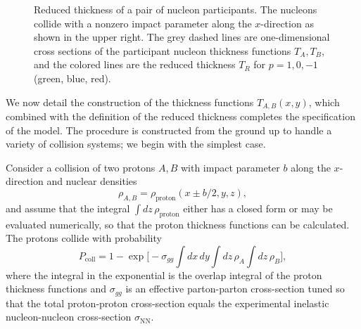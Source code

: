 \documentclass[aps,prc,reprint,amsmath]{revtex4-1}
\begin{document}
\begin{figure}[t]
  \caption{
    \label{fig:TR}
    Reduced thickness of a pair of nucleon participants.
    The nucleons collide with a nonzero impact parameter along the $x$-direction as shown in the upper right.
    The grey dashed lines are one-dimensional cross sections of the participant nucleon thickness functions $T_A, T_B$, and the colored lines are the reduced thickness $T_R$ for $p = 1, 0, -1$ (green, blue, red).
  }
\end{figure}

We now detail the construction of the thickness functions $T_{A,B}(x, y)$, which combined with the definition
of the reduced thickness completes the specification of the model.  The procedure is constructed from the
ground up to handle a variety of collision systems; we begin with the simplest case.

Consider a collision of two protons $A, B$ with impact parameter $b$ along the $x$-direction and nuclear densities
\begin{equation}
  \rho_{A,B} = \rho_\text{proton}(x \pm b/2, y, z),
\end{equation}
and assume that the integral $\int dz \, \rho_\text{proton}$ either has a closed form or may be evaluated numerically, so that the proton thickness functions can be calculated.
The protons collide with probability \cite{dEnterria:2010hd}
\begin{equation}
  P_\text{coll} = 1 - \exp\biggl[ -\sigma_{gg} \int dx \, dy \int dz \, \rho_A \int dz \, \rho_B \biggr],
  \label{eq:pcoll}
\end{equation}
where the integral in the exponential is the overlap integral of the proton thickness functions and
$\sigma_{gg}$ is an effective parton-parton cross-section tuned so that the total proton-proton
cross-section equals the experimental inelastic nucleon-nucleon cross-section $\sigma_\text{NN}$.
\end{document}
